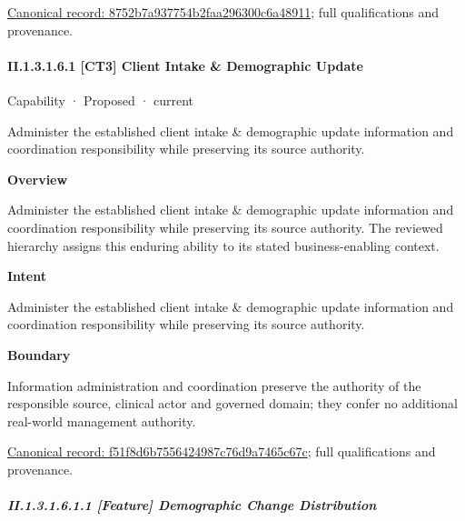 {\footnotesize \href{../../../../continuum/strategy/capability/8752b7a937754b2faa296300c6a48911.md}{Canonical record: 8752b7a937754b2faa296300c6a48911}; full qualifications and provenance.}\par
\paragraph*{II.1.3.1.6.1 [CT3] Client Intake \& Demographic Update}
\label{navigation:II.1.3.1.6.1}

\label{element:f51f8d6b7556424987c76d9a7465c67c}
{\small Capability · Proposed · current}\par

Administer the established client intake \& demographic update information and coordination responsibility while preserving its source authority.



\textbf{Overview}



Administer the established client intake \& demographic update information and coordination responsibility while preserving its source authority. The reviewed hierarchy assigns this enduring ability to its stated business-enabling context.



\textbf{Intent}



Administer the established client intake \& demographic update information and coordination responsibility while preserving its source authority.



\textbf{Boundary}



Information administration and coordination preserve the authority of the responsible source, clinical actor and governed domain; they confer no additional real-world management authority.


{\footnotesize \href{../../../../continuum/strategy/capability/f51f8d6b7556424987c76d9a7465c67c.md}{Canonical record: f51f8d6b7556424987c76d9a7465c67c}; full qualifications and provenance.}\par
\subparagraph*{II.1.3.1.6.1.1 [Feature] Demographic Change Distribution}
\label{navigation:II.1.3.1.6.1.1}

